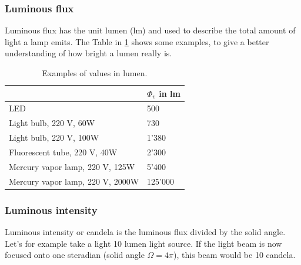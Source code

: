 \subsubsection{Luminous flux}
Luminous flux has the unit lumen (lm) and used to describe the total amount of light a lamp emits.
The Table in \ref{theory:lumflux} shows some examples, to give a better understanding of how bright a lumen really is.
\begin{table}[ht]
\begin{tabular}{ |p{12cm}| p{2cm}|  }
	\hline
	& $\Phi_v$ in lm\\
	
	
	\hline
	LED		& 500\\
	Light bulb, 220 V, 60W		& 730\\
	Light bulb, 220 V, 100W		& 1'380\\
	Fluorescent tube, 220 V, 40W		& 2'300\\
	Mercury vapor lamp, 220 V, 125W		& 5'400\\
	Mercury vapor lamp, 220 V, 2000W		& 125'000\\
	\hline
\end{tabular}
\caption{Examples of values in lumen.\label{theory:lumflux}}
\end{table}

\subsubsection{Luminous intensity}
Luminous intensity or candela is the luminous flux divided by the solid angle.
Let's for example take a light 10 lumen light source.
If the light beam is now focused onto one steradian (solid angle $\Omega = 4\pi$), this beam would be 10 candela.

